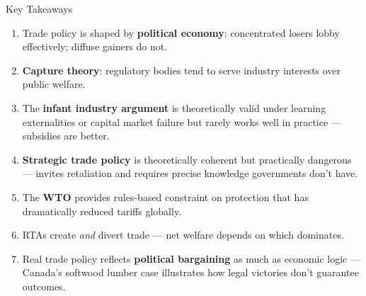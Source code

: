 \documentclass[aspectratio=169]{beamer}
\begin{document}
\begin{frame}{Key Takeaways}
\begin{enumerate}
  \item Trade policy is shaped by \textbf{political economy}: concentrated losers lobby effectively; diffuse gainers do not.
  \item \textbf{Capture theory}: regulatory bodies tend to serve industry interests over public welfare.
  \item The \textbf{infant industry argument} is theoretically valid under learning externalities or capital market failure but rarely works well in practice --- subsidies are better.
  \item \textbf{Strategic trade policy} is theoretically coherent but practically dangerous --- invites retaliation and requires precise knowledge governments don't have.
  \item The \textbf{WTO} provides rules-based constraint on protection that has dramatically reduced tariffs globally.
  \item RTAs create \emph{and} divert trade --- net welfare depends on which dominates.
  \item Real trade policy reflects \textbf{political bargaining} as much as economic logic --- Canada's softwood lumber case illustrates how legal victories don't guarantee outcomes.
\end{enumerate}
\end{frame}
\end{document}
